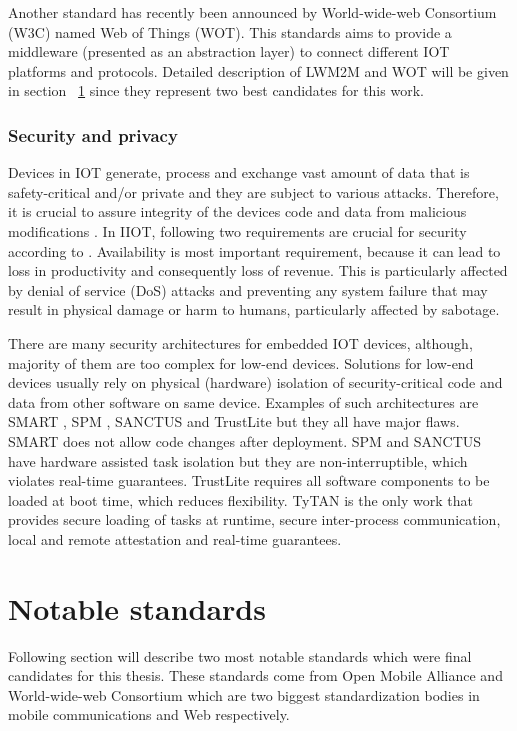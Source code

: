 Another standard has recently been announced by World-wide-web Consortium (W3C) named Web of Things (WOT). This standards aims to provide a middleware (presented as an abstraction layer) to connect different IOT platforms and protocols. Detailed description of LWM2M and WOT will be given in section ~\ref{section:NotableStandards} since they represent two best candidates for this work.


\subsubsection{Security and privacy}

Devices in IOT generate, process and exchange vast amount of data that is safety-critical and/or private and they are subject to various attacks. Therefore, it is crucial to assure integrity of the devices code and data from malicious modifications \cite{Control2014}. In IIOT, following two requirements are crucial for security according to \cite{Sadeghi2015}. Availability is most important requirement, because it can lead to loss in productivity and consequently loss of revenue. This is particularly affected by denial of service (DoS) attacks and preventing any system failure that may result in physical damage or harm to humans, particularly affected by sabotage.

There are many security architectures for embedded IOT devices, although, majority of them are too complex for low-end devices. Solutions for low-end devices usually rely on physical (hardware) isolation of security-critical code and data from other software on same device. Examples of such architectures are SMART \cite{Smart}, SPM \cite{SPM}, SANCTUS \cite{Sanctus} and TrustLite \cite{TrustLite} but they all have major flaws. SMART does not allow code changes after deployment. SPM and SANCTUS have hardware assisted task isolation but they are non-interruptible, which violates real-time guarantees. TrustLite requires all software components to be loaded at boot time, which reduces flexibility. TyTAN \cite{Brasser} is the only work that provides secure loading of tasks at runtime, secure inter-process communication, local and remote attestation and real-time guarantees. 
\section{Notable standards}
\label{section:NotableStandards}

Following section will describe two most notable standards which were final candidates for this thesis. These standards come from Open Mobile Alliance and World-wide-web Consortium which are two biggest standardization bodies in mobile communications and Web respectively.

